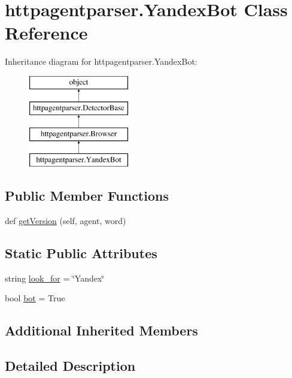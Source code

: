\hypertarget{classhttpagentparser_1_1_yandex_bot}{}\section{httpagentparser.\+Yandex\+Bot Class Reference}
\label{classhttpagentparser_1_1_yandex_bot}
Inheritance diagram for httpagentparser.\+Yandex\+Bot\+:\begin{figure}[H]
\begin{center}
\leavevmode
\includegraphics[height=4.000000cm]{classhttpagentparser_1_1_yandex_bot}
\end{center}
\end{figure}
\subsection*{Public Member Functions}
\begin{DoxyCompactItemize}
\item 
def \hyperlink{classhttpagentparser_1_1_yandex_bot_a96b226b5de52c7c66308525a4e174b90}{get\+Version} (self, agent, word)
\end{DoxyCompactItemize}
\subsection*{Static Public Attributes}
\begin{DoxyCompactItemize}
\item 
string \hyperlink{classhttpagentparser_1_1_yandex_bot_a1d486debe6eb8bf089fafbb594598449}{look\+\_\+for} = \char`\"{}Yandex\char`\"{}
\item 
bool \hyperlink{classhttpagentparser_1_1_yandex_bot_a1b6a651365f771d94114b55a6dd36073}{bot} = True
\end{DoxyCompactItemize}
\subsection*{Additional Inherited Members}


\subsection{Detailed Description}


